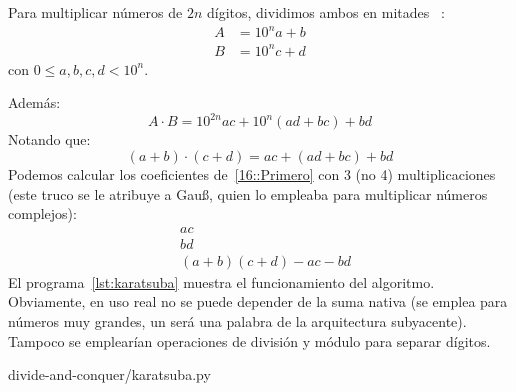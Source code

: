   \begin{example}
    Para multiplicar números de \(2 n\) dígitos,
    dividimos ambos en mitades~%
      \cite{karatsuba62:_multiplication}:
    \begin{align*}
      A
        &= 10^n a + b \\
      B
        &= 10^n c + d
    \end{align*}
    con \(0 \le a, b, c, d < 10^n\).

    Además:
    \begin{equation}\label{16::Primero}
      A \cdot B
        = 10^{2 n} a c + 10^n (a d + b c) + b d
    \end{equation}
    Notando que:
    \begin{equation*}
      (a + b) \cdot (c + d)
        = a c + (a d + b c) + b d
    \end{equation*}
    Podemos calcular los coeficientes de~\eqref{16::Primero}
    con \num{3} (no \num{4}) multiplicaciones
    (este truco se le atribuye a Gauß,
     quien lo empleaba para multiplicar números complejos):
    \begin{align*}
      &a c \\
      &b d \\
      &(a + b) (c + d) - a c - b d
    \end{align*}
    El programa~\ref{lst:karatsuba} muestra el funcionamiento del algoritmo.
    Obviamente,
    en uso real no se puede depender de la suma nativa
    (se emplea para números muy grandes,
     un  será una palabra de la arquitectura subyacente).
    Tampoco se emplearían operaciones de división y módulo
    para separar dígitos.
    
                    {divide-and-conquer/karatsuba.py}
  \end{example}
